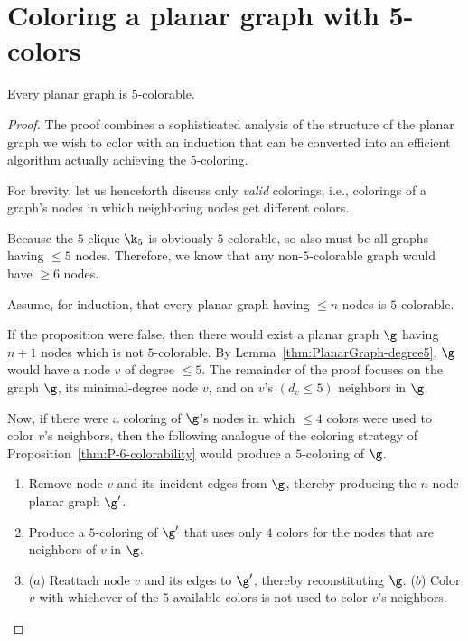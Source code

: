 
\chapter{Coloring a planar graph with 5-colors}
\label{Appendix:5colors}

\begin{prop}
\label{thm:P-5-colorability}
Every planar graph is $5$-colorable.
\end{prop}


\begin{proof}
The proof combines a sophisticated analysis of the structure of the
planar graph we wish to color with an induction that can be converted
into an efficient algorithm actually achieving the $5$-coloring.

\smallskip

For brevity, let us henceforth discuss only {\em valid} colorings,
i.e., colorings of a graph's nodes in which neighboring nodes get
different colors.

\smallskip

Because the $5$-clique $\k_5$ is obviously $5$-colorable, so also must
be all graphs having $\leq 5$ nodes.  Therefore, we know that any
non-$5$-colorable graph would have $\geq 6$ nodes.

\smallskip

Assume, for induction, that every planar graph having $\leq n$ nodes
is $5$-colorable.

\smallskip

If the proposition were false, then there would exist a planar graph
$\g$ having $n+1$ nodes which is not $5$-colorable.  By
Lemma~\ref{thm:PlanarGraph-degree5}, $\g$ would have a node $v$ of
degree $\leq 5$.  The remainder of the proof focuses on the graph
$\g$, its minimal-degree node $v$, and on $v$'s $(d_v \leq 5)$
neighbors in $\g$.

Now, if there were a coloring of $\g$'s nodes in which $\leq 4$ colors
were used to color $v$'s neighbors, then the following analogue of the
coloring strategy of Proposition~\ref{thm:P-6-colorability} would
produce a $5$-coloring of $\g$.
\begin{enumerate}
\item
Remove node $v$ and its incident edges from $\g$, thereby producing
the $n$-node planar graph $\g'$.
\item
Produce a $5$-coloring of $\g'$ that uses only $4$ colors for the
nodes that are neighbors of $v$ in $\g$.
\item
($a$) Reattach node $v$ and its edges to $\g'$, thereby reconstituting
  $\g$.  ($b$) Color $v$ with whichever of the $5$ available colors is
  not used to color $v$'s neighbors.
\end{enumerate}


\end{proof}
